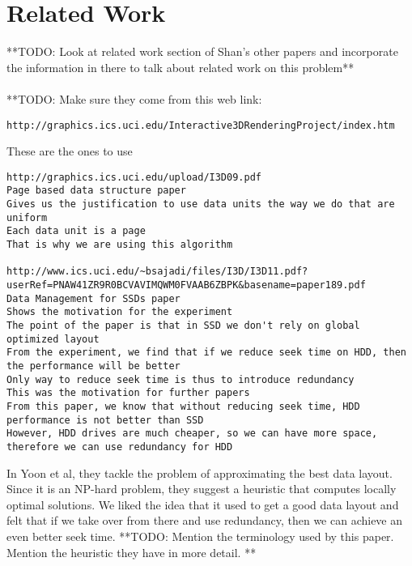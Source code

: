 \documentclass[11pt,psfig]{article}
\begin{document}
\section*{Related Work}

**TODO: Look at related work section of Shan's other papers and incorporate the information in there to talk about related work on this problem**\\
\\
**TODO: Make sure they come from this web link: 
\begin{verbatim}
http://graphics.ics.uci.edu/Interactive3DRenderingProject/index.htm
\end{verbatim}
These are the ones to use
\begin{verbatim}
http://graphics.ics.uci.edu/upload/I3D09.pdf
Page based data structure paper
Gives us the justification to use data units the way we do that are uniform
Each data unit is a page
That is why we are using this algorithm

http://www.ics.uci.edu/~bsajadi/files/I3D/I3D11.pdf?userRef=PNAW41ZR9R0BCVAVIMQWM0FVAAB6ZBPK&basename=paper189.pdf
Data Management for SSDs paper
Shows the motivation for the experiment
The point of the paper is that in SSD we don't rely on global optimized layout
From the experiment, we find that if we reduce seek time on HDD, then the performance will be better
Only way to reduce seek time is thus to introduce redundancy
This was the motivation for further papers
From this paper, we know that without reducing seek time, HDD performance is not better than SSD
However, HDD drives are much cheaper, so we can have more space, therefore we can use redundancy for HDD
\end{verbatim}
In Yoon et al, they tackle the problem of approximating the best data layout. Since it is an NP-hard problem, they suggest a heuristic that computes locally optimal solutions. We liked the idea that it used to get a good data layout and felt that if we take over from there and use redundancy, then we can achieve an even better seek time.
**TODO: Mention the terminology used by this paper. Mention the heuristic they have in more detail. **\\
\\
\end{document}
